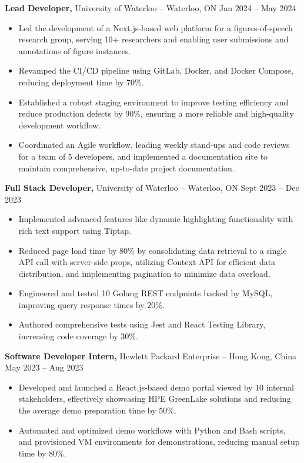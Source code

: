 \textbf{Lead Developer,} {University of Waterloo} -- Waterloo, ON \hfill Jan 2024 -- May 2024 \\
\vspace{-9pt}
\begin{itemize}
  \item Led the development of a Next.js-based web platform for a figures-of-speech research group, serving 10+ researchers and enabling user submissions and annotations of figure instances.
  \item Revamped the CI/CD pipeline using GitLab, Docker, and Docker Compose, reducing deployment time by 70\%.
  \item Established a robust staging environment to improve testing efficiency and reduce production defects by 90\%, ensuring a more reliable and high-quality development workflow.
  \item Coordinated an Agile workflow, leading weekly stand-ups and code reviews for a team of 5 developers, and implemented a documentation site to maintain comprehensive, up-to-date project documentation.
\end{itemize}

\textbf{Full Stack Developer,} {University of Waterloo} -- Waterloo, ON \hfill Sept 2023 -- Dec 2023 \\
\vspace{-9pt}
\begin{itemize}
  \item Implemented advanced features like dynamic highlighting functionality with rich text support using Tiptap.
  \item Reduced page load time by 80\% by consolidating data retrieval to a single API call with server-side props, utilizing Context API for efficient data distribution, and implementing pagination to minimize data overload.
  \item Engineered and tested 10 Golang REST endpoints backed by MySQL, improving query response times by 20\%.
  \item Authored comprehensive tests using Jest and React Testing Library, increasing code coverage by 30\%.
\end{itemize}

\textbf{Software Developer Intern,} {Hewlett Packard Enterprise} -- Hong Kong, China \hfill May 2023 -- Aug 2023 \\
\vspace{-9pt}
\begin{itemize}
  \item Developed and launched a React.js-based demo portal viewed by 10 internal stakeholders, effectively showcasing HPE GreenLake solutions and reducing the average demo preparation time by 50\%.
  \item Automated and optimized demo workflows with Python and Bash scripts, and provisioned VM environments for demonstrations, reducing manual setup time by 80\%.
\end{itemize}

